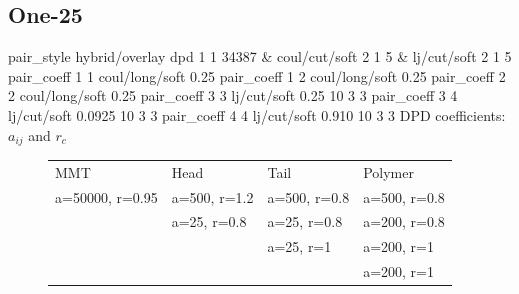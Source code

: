 \documentclass[a4paper]{article}
\begin{document}
\subsection*{One-25}
pair\_style hybrid/overlay dpd 1 1 34387 \& coul/cut/soft 2 1 5 \& 
lj/cut/soft 2 1 5\newline
pair\_coeff 1 1 coul/long/soft 0.25\newline
pair\_coeff 1 2 coul/long/soft 0.25\newline
pair\_coeff 2 2 coul/long/soft 0.25\newline
pair\_coeff 3 3 lj/cut/soft 0.25   10 3 3\newline
pair\_coeff 3 4 lj/cut/soft 0.0925 10 3 3\newline
pair\_coeff 4 4 lj/cut/soft 0.910  10 3 3\newline
DPD coefficients: $a_{ij}$ and $r_c$
\begin{figure}[H]\begin{tabular}{llll}
MMT             & Head         & Tail         & Polymer      \\
a=50000, r=0.95 & a=500, r=1.2 & a=500, r=0.8 & a=500, r=0.8 \\
                & a=25,  r=0.8 & a=25,  r=0.8 & a=200, r=0.8 \\
                &              & a=25,  r=1   & a=200, r=1   \\
                &              &              & a=200, r=1   \\
\end{tabular}\end{figure}
\end{document}

